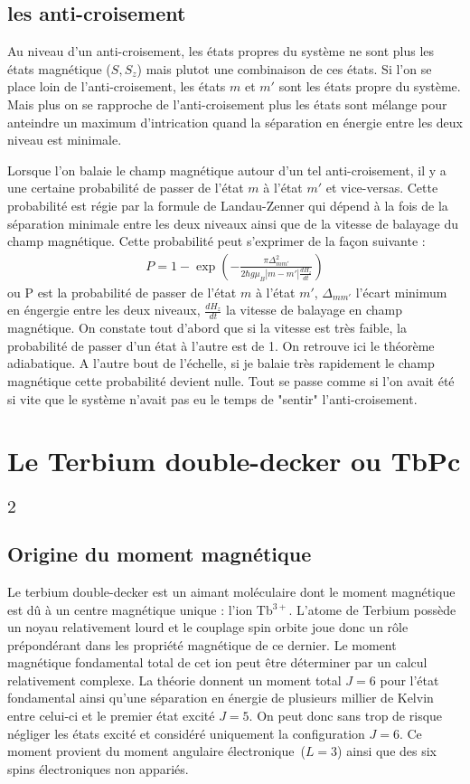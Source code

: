 \subsection{les anti-croisement}
Au niveau d'un anti-croisement, les états propres du système ne sont plus les états magnétique ($S,S_z$) mais plutot une combinaison de ces états. Si l'on se place loin de l'anti-croisement, les états $m$ et $m'$ sont les états propre du système. Mais plus on se rapproche de l'anti-croisement plus les états sont mélange pour anteindre un maximum d'intrication quand la séparation en énergie entre les deux niveau est minimale.

Lorsque l'on balaie le champ magnétique autour d'un tel anti-croisement, il y a une certaine probabilité de passer de l'état $m$ à l'état $m'$ et vice-versas. Cette probabilité est régie par la formule de Landau-Zenner qui dépend à la fois de la séparation minimale entre les deux niveaux ainsi que de la vitesse de balayage du champ magnétique. Cette probabilité peut s'exprimer de la façon suivante :
\begin{eqnarray}
P = 1 - \exp \left( -\frac{\pi \Delta^2_{mm'}}{2 \hbar g \mu_B |m-m'|\frac{dH_z}{dt}} \right)
\end{eqnarray}
ou P est la probabilité de passer de l'état $m$ à l'état $m'$, $\Delta_{mm'}$ l'écart minimum en éngergie entre les deux niveaux, $\frac{dH_z}{dt}$ la vitesse de balayage en champ magnétique. On constate tout d'abord que si la vitesse est très faible, la probabilité de passer d'un état à l'autre est de 1. On retrouve ici le théorème adiabatique. A l'autre bout de l'échelle, si je balaie très rapidement le champ magnétique cette probabilité devient nulle. Tout se passe comme si l'on avait été si vite que le système n'avait pas eu le temps de "sentir" l'anti-croisement.

\section{Le Terbium double-decker ou TbPc$_2$}

\subsection{Origine du moment magnétique}
Le terbium double-decker est un aimant moléculaire dont le moment magnétique est d\^u à un centre magnétique unique : l'ion Tb$^{3+}$. L'atome de Terbium possède un noyau relativement lourd et le couplage spin orbite joue donc un r\^ole prépondérant dans les propriété magnétique de ce dernier. Le moment magnétique fondamental total de cet ion peut \^etre déterminer par un calcul relativement complexe. La théorie donnent un moment total $J=6$ pour l'état fondamental ainsi qu'une séparation en énergie de plusieurs millier de Kelvin entre celui-ci et le premier état excité $J=5$. On peut donc sans trop de risque négliger les états excité et considéré uniquement la configuration $J=6$. Ce moment provient du moment angulaire électronique~($L=3$) ainsi que des six spins électroniques non appariés. 

